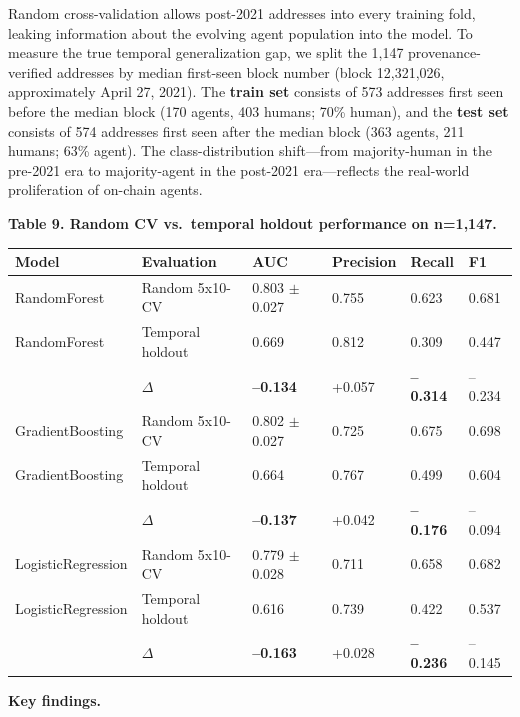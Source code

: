 \documentclass[sigconf,nonacm=false]{acmart}
\begin{document}
Random cross-validation allows post-2021 addresses into every training fold, leaking information about the evolving agent population into the model. To measure the true temporal generalization gap, we split the 1,147 provenance-verified addresses by median first-seen block number (block 12,321,026, approximately April 27, 2021). The \textbf{train set} consists of 573 addresses first seen before the median block (170 agents, 403 humans; 70\% human), and the \textbf{test set} consists of 574 addresses first seen after the median block (363 agents, 211 humans; 63\% agent). The class-distribution shift---from majority-human in the pre-2021 era to majority-agent in the post-2021 era---reflects the real-world proliferation of on-chain agents.

\textbf{Table 9. Random CV vs.\ temporal holdout performance on n=1,147.}

\begin{table}[h]
\centering
\small
\begin{tabular}{llllll}
\toprule
Model & Evaluation & AUC & Precision & Recall & F1 \\
\midrule
RandomForest & Random 5x10-CV & 0.803 $\pm$ 0.027 & 0.755 & 0.623 & 0.681 \\
RandomForest & Temporal holdout & 0.669 & 0.812 & 0.309 & 0.447 \\
 & $\Delta$ & \textbf{--0.134} & +0.057 & \textbf{--0.314} & --0.234 \\
\midrule
GradientBoosting & Random 5x10-CV & 0.802 $\pm$ 0.027 & 0.725 & 0.675 & 0.698 \\
GradientBoosting & Temporal holdout & 0.664 & 0.767 & 0.499 & 0.604 \\
 & $\Delta$ & \textbf{--0.137} & +0.042 & \textbf{--0.176} & --0.094 \\
\midrule
LogisticRegression & Random 5x10-CV & 0.779 $\pm$ 0.028 & 0.711 & 0.658 & 0.682 \\
LogisticRegression & Temporal holdout & 0.616 & 0.739 & 0.422 & 0.537 \\
 & $\Delta$ & \textbf{--0.163} & +0.028 & \textbf{--0.236} & --0.145 \\
\bottomrule
\end{tabular}
\end{table}

\textbf{Key findings.}
\end{document}

